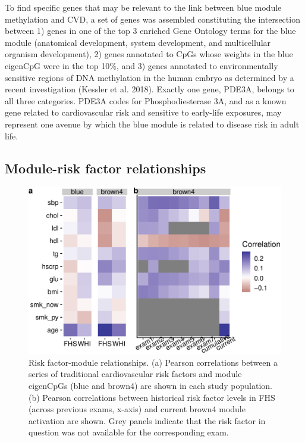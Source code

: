 \documentclass[]{article}
\theoremstyle{definition}
\theoremstyle{definition}
\theoremstyle{definition}
\theoremstyle{remark}
\begin{document}
To find specific genes that may be relevant to the link between blue
module methylation and CVD, a set of genes was assembled constituting
the intersection between 1) genes in one of the top 3 enriched Gene
Ontology terms for the blue module (anatomical development, system
development, and multicellular organism development), 2) genes annotated
to CpGs whose weights in the blue eigenCpG were in the top 10\%, and 3)
genes annotated to environmentally sensitive regions of DNA methylation
in the human embryo as determined by a recent investigation (Kessler et
al. 2018). Exactly one gene, PDE3A, belongs to all three categories.
PDE3A codes for Phosphodiesterase 3A, and as a known gene related to
cardiovascular risk and sensitive to early-life exposures, may represent
one avenue by which the blue module is related to disease risk in adult
life.

\subsection{Module-risk factor
relationships}\label{module-risk-factor-relationships}

\begin{figure}[htbp]
\centering
\includegraphics{../doc/figures/risk-factor-correlation-plots-1.pdf}
\caption{\label{fig:risk-factor-correlation-plots}Risk factor-module
relationships. (a) Pearson correlations between a series of traditional
cardiovascular risk factors and module eigenCpGs (blue and brown4) are
shown in each study population. (b) Pearson correlations between
historical risk factor levels in FHS (across previous exams, x-axis) and
current brown4 module activation are shown. Grey panels indicate that
the risk factor in question was not available for the corresponding
exam.}
\end{figure}
\end{document}
